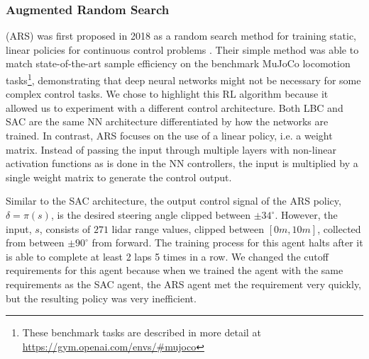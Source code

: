\documentclass[manuscript,screen,review]{acmart}
\newcommand{\nate}[1]{\textcolor{magenta}{\textbf{\underline{Nate:}} #1}}
\begin{document}

\subsubsection{Augmented Random Search} 
(ARS) was first proposed in 2018 as a random search method for training static, linear policies for continuous control problems \cite{mania2018simple}. Their simple method was able to match state-of-the-art sample efficiency on the benchmark MuJoCo locomotion tasks\footnote{These benchmark tasks are described in more detail at \url{https://gym.openai.com/envs/\#mujoco}}, demonstrating that deep neural networks might not be necessary for some complex control tasks. We chose to highlight this RL algorithm because %
it allowed us to experiment with a different control architecture. Both LBC and SAC are the same NN architecture differentiated by how the networks are trained. In contrast, ARS focuses on the use of a linear policy, i.e. a weight matrix. Instead of passing the input through multiple layers with non-linear activation functions as is done in the NN controllers, the input is multiplied by a single weight matrix to generate the control output. %

Similar to the SAC architecture, the output control signal of the ARS policy, $\delta = \pi(s)$, is the desired steering angle clipped between $\pm34^{\circ}$. However, the input, $s$, consists of $271$ lidar range values, clipped between $[0m, 10m]$, collected from between $\pm90^{\circ}$ from forward. The training process for this agent halts after it is able to complete at least 2 laps 5 times in a row. We changed the cutoff requirements for this agent because when we trained the agent with the same requirements as the SAC agent, the ARS agent met the requirement very quickly, but the resulting policy was very inefficient.
\end{document}
